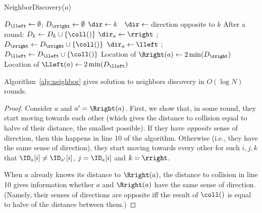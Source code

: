 \begin{algorithm}[]
	\caption{NeighborDiscovery($a$)}
	\label{alg:neighbor}
	\begin{algorithmic}[1]
    \State $D_{\lleft}\gets\emptyset$; $D_{\rright}\gets\emptyset$ 
                 $\dir\gets k$
                \Else   \ $\dir\gets$ direction opposite to $k$ \EndIf
                \State \SingleRound
                \State After a round: $D_k\gets D_k\cup\{\coll()\}$ \EndFor
        \EndFor
    \EndFor
    \State $\dir_a\gets \rright$ 
    \State \SingleRound; $D_\rright\gets D_\rright\cup\{\coll()\}$ \State $\dir_a\gets \lleft$
    \State \SingleRound; $D_\lleft\gets D_\lleft\cup\{\coll()\}$ \State Location of $\Rright(a)\gets 2 \min (D_{\rright})$
    \State Location of $\Lleft(a)\gets 2 \min (D_{\lleft})$
    \end{algorithmic}
\end{algorithm}

\begin{proposition}\label{p:alg1}
Algorithm~\ref{alg:neighbor} gives solution to neighbors discovery in $O(\log N)$ rounds.
\end{proposition}
\iffull
\begin{proof}
Consider $a$ and $a'=\Rright(a)$. First, we show that, in some round,
they start moving towards each other (which gives the distance to collision
equal to halve of their distance, the smallest possible). If they have {\em opposite} sense of direction,
then this happens in line 10 of the algorithm. Otherwise (i.e., they have the
same sense of direction), they start moving towards every other for such $i,j,k$
that $\ID_a[i]\neq \ID_{a'}[i]$, $j=\ID_a[i]$ and $k=\rright$.

When $a$ already knows its distance to $\Rright(a)$, the distance to collision
in line 10 gives information whether $a$ and $\Rright(a)$ have the same sense of direction.
(Namely, their senses of directions are opposite iff the result of $\coll()$ is equal to halve of
the distance between them.)
\end{proof}
\else
\fi

